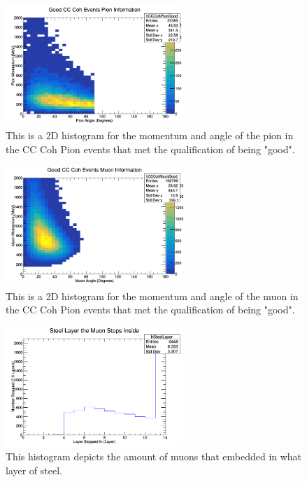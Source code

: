 \documentclass[11pt]{article}
\begin{document}
\begin{figure}[H]
\centering
\includegraphics[width=0.6\textwidth]{NewNMReinSehgalImages/5-GoodCCCohPionInfoNMRS.png}
\caption{This is a 2D histogram for the momentum and angle of the pion in the CC Coh Pion events that met the qualification of being "good".}
\end{figure}

\begin{figure}[H]
\centering
\includegraphics[width=0.6\textwidth]{NewNMReinSehgalImages/6-GoodCCCohMuonInfoNMRS.png}
\caption{This is a 2D histogram for the momentum and angle of the muon in the CC Coh Pion events that met the qualification of being "good".}
\end{figure}

\begin{figure}[H]
\centering
\includegraphics[width=0.6\textwidth]{NewNMReinSehgalImages/7-LayerPenetrationNMRS.png}
\caption{This histogram depicts the amount of muons that embedded in what layer of steel.}
\end{figure}
\end{document}
